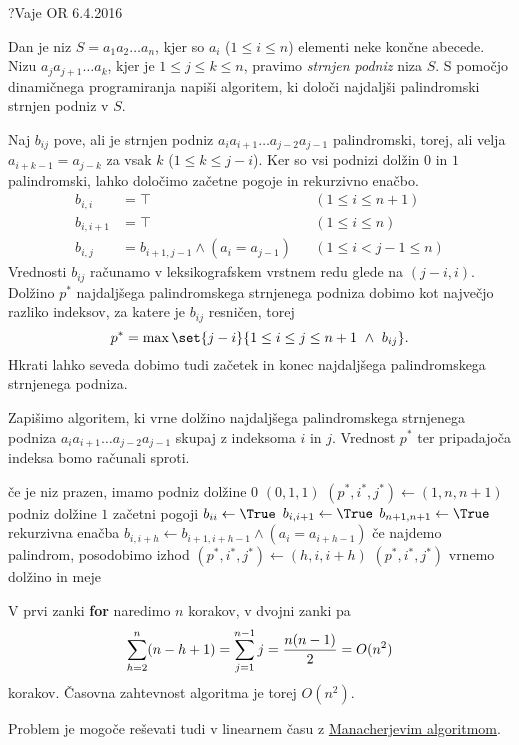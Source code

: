 \begin{naloga}{?}{Vaje OR 6.4.2016}
\begin{vprasanje}
Dan je niz $S = a_1 a_2 \dots a_n$,
kjer so $a_i$ ($1 \le i \le n$) elementi neke končne abecede.
Nizu $a_j a_{j+1} \dots a_k$, kjer je $1 \le j \le k \le n$,
pravimo {\em strnjen podniz} niza $S$.
S pomočjo dinamičnega programiranja napiši algoritem,
ki določi najdaljši palindromski strnjen podniz v $S$.
\end{vprasanje}

\begin{odgovor}
Naj $b_{ij}$ pove,
ali je strnjen podniz $a_i a_{i+1} \dots a_{j-2} a_{j-1}$ palindromski,
torej, ali velja $a_{i+k-1} = a_{j-k}$ za vsak $k$ ($1 \le k \le j-i$).
Ker so vsi podnizi dolžin $0$ in $1$ palindromski,
lahko določimo začetne pogoje in rekurzivno enačbo.
\begin{align*}
b_{i,i} &= \top && (1 \le i \le n+1) \\
b_{i,i+1} &= \top && (1 \le i \le n) \\
b_{i,j} &= b_{i+1,j-1} \land (a_i = a_{j-1}) && (1 \le i < j-1 \le n)
\end{align*}
Vrednosti $b_{ij}$ računamo v leksikografskem vrstnem redu
glede na $(j-i, i)$.
Dolžino $p^*$ najdaljšega palindromskega strnjenega podniza
dobimo kot največjo razliko indeksov,
za katere je $b_{ij}$ resničen, torej
$$
p^* = \max\set{j-i}{1 \le i \le j \le n+1 \ \land \ b_{ij}} .
$$
Hkrati lahko seveda dobimo tudi začetek in konec
najdaljšega palindromskega strnjenega podniza.

Zapišimo algoritem,
ki vrne dolžino najdaljšega palindromskega strnjenega podniza
$a_i a_{i+1} \dots a_{j-2} a_{j-1}$ skupaj z indeksoma $i$ in $j$.
Vrednost $p^*$ ter pripadajoča indeksa bomo računali sproti.
\begin{small}
\begin{algorithmic}
     \hfill če je niz prazen, imamo podniz dolžine $0$
        \State \Return $(0, 1, 1)$
    \EndIf
    \State $(p^*, i^*, j^*) \gets (1, n, n+1)$ \hfill podniz dolžine $1$
     \hfill začetni pogoji
        \State $b_{ii} \gets \True$
        \State $b_{i,i+1} \gets \True$
    \EndFor
    \State $b_{n+1,n+1} \gets \True$
     \hfill rekurzivna enačba
            \State $b_{i,i+h} \gets b_{i+1,i+h-1} \land (a_i = a_{i+h-1})$
             \hfill če najdemo palindrom, posodobimo izhod
                \State $(p^*, i^*, j^*) \gets (h, i, i+h)$
            \EndIf
        \EndFor
    \EndFor
    \State \Return $(p^*, i^*, j^*)$ \hfill vrnemo dolžino in meje
\EndFunction
\end{algorithmic}
\end{small}
V prvi zanki {\bf for} naredimo $n$ korakov,
v dvojni zanki pa
$$
\sum_{h=2}^n (n-h+1) = \sum_{j=1}^{n-1} j = {n(n-1) \over 2} = O(n^2)
$$
korakov.
Časovna zahtevnost algoritma je torej $O(n^2)$.

Problem je mogoče reševati tudi v linearnem času z
\href{https://en.wikipedia.org/wiki/Longest_palindromic_substring#%
Manacher's_algorithm}{Manacherjevim algoritmom}.
\end{odgovor}
\end{naloga}

